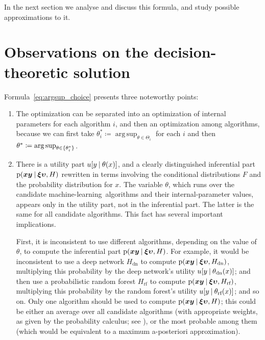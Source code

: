 \documentclass[\ifafour a4paper,12pt,\else a5paper,10pt,\fi%
onecolumn,oneside,article,%
british%
]{memoir}
\theoremstyle{remark}
\theoremstyle{innote}
\newcommand*{\defd}{\coloneqq}
\DeclarePairedDelimiter\set{\{}{\}} %
\newcommand*{\p}{\mathrm{p}}%
\renewcommand*{\|}[1][]{\nonscript\:#1\vert\nonscript\:\mathopen{}}
\newcommand*{\sect}{\S}%
\DeclareMathOperator*{\argsup}{arg\,sup}
\newcommand*{\ml}{machine-learning}
\newcommand*{\bz}{\bm{xy}}
\newcommand*{\bzz}{\bm{\xi\upsilon}}
\begin{document}
In the next section we analyse and discuss this formula, and study possible
approximations to it.

\section{Observations on the decision-theoretic solution}
\label{sec:observations_solution}

Formula~\eqref{eq:argsup_choice} presents three noteworthy points:
\begin{enumerate}[label=\textbf{(\Alph*)}, wide]
\item\label{item:nested_optim} The optimization can be separated into an
  optimization of internal parameters for each algorithm $i$, and then an
  optimization among algorithms, because we can first take
  $\theta^{*}_{i} \defd \argsup_{\theta \in \varTheta_{i}}$ for each $i$
  and then $\theta^{*} \defd \argsup_{\theta \in \set{\theta^{*}_{i}}}$.
  
\item\label{item:utility_vs_inference} There is a utility part
  $u[y \| \theta(x)]$, and a clearly distinguished inferential part
  $\p(\bz\|\bzz,H)$ rewritten in terms involving the conditional
  distributions $F$ and the probability distribution for $x$. The variable
  $\theta$, which runs over the candidate \ml\ algorithms and their
  internal-parameter values, appears only in the utility part, not in the
  inferential part. The latter is the same for all candidate algorithms.
  This fact has several important implications.

  First, it is inconsistent to use different algorithms, depending on the
  value of $\theta$, to compute the inferential part $\p(\bz\|\bzz,H)$. For
  example, it would be inconsistent to use a deep network $H_{\text{dn}}$
  to compute $\p(\bz\|\bzz,H_{\text{dn}})$, multiplying this probability by
  the deep network's utility $u[y \| \theta_{\text{dn}}(x)]$; and then use
  a probabilistic random forest $H_{\text{rf}}$ to compute
  $\p(\bz\|\bzz,H_{\text{rf}})$, multiplying this probability by the random
  forest's utility $u[y \| \theta_{\text{rf}}(x)]$; and so on. Only one
  algorithm should be used to compute $\p(\bz\|\bzz,H)$; this could be
  either an average over all candidate algorithms (with appropriate
  weights, as given by the probability calculus; see \cite[\sect~28.1
  p.~347]{mackay1995_r2005}), or the most probable among them (which would
  be equivalent to a maximum a-posteriori approximation).


\end{enumerate}
\end{document}
